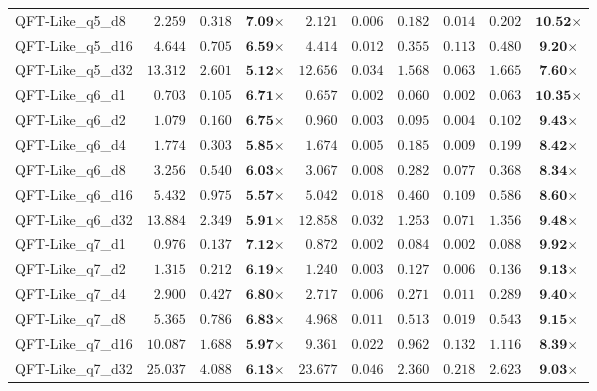 \begin{table*}[t]
{\begin{tabular}{| l || r r c || r r r r r c |}
QFT-Like\_q5\_d8 & $2.259$ & $0.318$ & $\textbf{7.09}$$\times$ & $2.121$ & $0.006$ & $0.182$ & $0.014$ & $0.202$ & $\textbf{10.52}$$\times$ \\
QFT-Like\_q5\_d16 & $4.644$ & $0.705$ & $\textbf{6.59}$$\times$ & $4.414$ & $0.012$ & $0.355$ & $0.113$ & $0.480$ & $\textbf{9.20}$$\times$ \\
QFT-Like\_q5\_d32 & $13.312$ & $2.601$ & $\textbf{5.12}$$\times$ & $12.656$ & $0.034$ & $1.568$ & $0.063$ & $1.665$ & $\textbf{7.60}$$\times$ \\
QFT-Like\_q6\_d1 & $0.703$ & $0.105$ & $\textbf{6.71}$$\times$ & $0.657$ & $0.002$ & $0.060$ & $0.002$ & $0.063$ & $\textbf{10.35}$$\times$ \\
QFT-Like\_q6\_d2 & $1.079$ & $0.160$ & $\textbf{6.75}$$\times$ & $0.960$ & $0.003$ & $0.095$ & $0.004$ & $0.102$ & $\textbf{9.43}$$\times$ \\
QFT-Like\_q6\_d4 & $1.774$ & $0.303$ & $\textbf{5.85}$$\times$ & $1.674$ & $0.005$ & $0.185$ & $0.009$ & $0.199$ & $\textbf{8.42}$$\times$ \\
QFT-Like\_q6\_d8 & $3.256$ & $0.540$ & $\textbf{6.03}$$\times$ & $3.067$ & $0.008$ & $0.282$ & $0.077$ & $0.368$ & $\textbf{8.34}$$\times$ \\
QFT-Like\_q6\_d16 & $5.432$ & $0.975$ & $\textbf{5.57}$$\times$ & $5.042$ & $0.018$ & $0.460$ & $0.109$ & $0.586$ & $\textbf{8.60}$$\times$ \\
QFT-Like\_q6\_d32 & $13.884$ & $2.349$ & $\textbf{5.91}$$\times$ & $12.858$ & $0.032$ & $1.253$ & $0.071$ & $1.356$ & $\textbf{9.48}$$\times$ \\
QFT-Like\_q7\_d1 & $0.976$ & $0.137$ & $\textbf{7.12}$$\times$ & $0.872$ & $0.002$ & $0.084$ & $0.002$ & $0.088$ & $\textbf{9.92}$$\times$ \\
QFT-Like\_q7\_d2 & $1.315$ & $0.212$ & $\textbf{6.19}$$\times$ & $1.240$ & $0.003$ & $0.127$ & $0.006$ & $0.136$ & $\textbf{9.13}$$\times$ \\
QFT-Like\_q7\_d4 & $2.900$ & $0.427$ & $\textbf{6.80}$$\times$ & $2.717$ & $0.006$ & $0.271$ & $0.011$ & $0.289$ & $\textbf{9.40}$$\times$ \\
QFT-Like\_q7\_d8 & $5.365$ & $0.786$ & $\textbf{6.83}$$\times$ & $4.968$ & $0.011$ & $0.513$ & $0.019$ & $0.543$ & $\textbf{9.15}$$\times$ \\
QFT-Like\_q7\_d16 & $10.087$ & $1.688$ & $\textbf{5.97}$$\times$ & $9.361$ & $0.022$ & $0.962$ & $0.132$ & $1.116$ & $\textbf{8.39}$$\times$ \\
QFT-Like\_q7\_d32 & $25.037$ & $4.088$ & $\textbf{6.13}$$\times$ & $23.677$ & $0.046$ & $2.360$ & $0.218$ & $2.623$ & $\textbf{9.03}$$\times$ \\
\hline
\end{tabular}
}
\end{table*}

